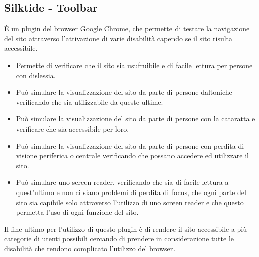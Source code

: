 \subsection{Silktide - Toolbar}
È un plugin del browser Google Chrome, che permette di testare la navigazione del sito attraverso l'attivazione di varie disabilità capendo se il sito risulta accessibile.
\begin{itemize}
	\item Permette di verificare che il sito sia usufruibile e di facile lettura per persone con dislessia.
	\item Può simulare la visualizzazione del sito da parte di persone daltoniche verificando che sia utilizzabile da queste ultime.
	\item Può simulare la visualizzazione del sito da parte di persone con la cataratta e verificare che sia accessibile per loro.
	\item Può simulare la visualizzazione del sito da parte di persone con perdita di visione periferica o centrale verificando che possano accedere ed utilizzare il sito.
	\item Può simulare uno screen reader, verificando che sia di facile lettura a quest'ultimo e non ci siano problemi di perdita di focus, che ogni parte del sito sia capibile solo attraverso l'utilizzo di uno screen reader e che questo permetta l'uso di ogni funzione del sito.
\end{itemize}
Il fine ultimo per l'utilizzo di questo plugin è di rendere il sito accessibile a più categorie di utenti possibili cercando di prendere in considerazione tutte le disabilità che rendono complicato l'utilizzo del browser.\\